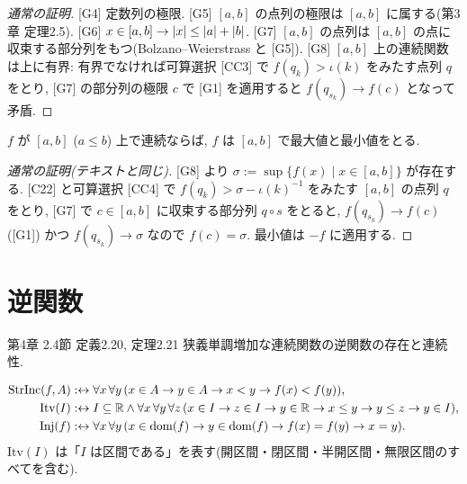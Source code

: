 \begin{lem}\end{lem}
\begin{proof}[通常の証明]
  [G4] 定数列の極限. [G5] $[a, b]$ の点列の極限は $[a, b]$ に属する(第3章 定理2.5). [G6] $x \in [a, b] \to \lvert x\rvert \leq \lvert a\rvert + \lvert b\rvert$. [G7] $[a, b]$ の点列は $[a, b]$ の点に収束する部分列をもつ(Bolzano--Weierstrass と [G5]). [G8] $[a, b]$ 上の連続関数は上に有界: 有界でなければ可算選択 [CC3] で $f(q_k) > \iota(k)$ をみたす点列 $q$ をとり, [G7] の部分列の極限 $c$ で [G1] を適用すると $f(q_{s_k}) \to f(c)$ となって矛盾.
\end{proof}

\begin{thm}
  $f$ が $[a, b]$ ($a \leq b$) 上で連続ならば, $f$ は $[a, b]$ で最大値と最小値をとる.
\end{thm}
\begin{proof}[通常の証明(テキストと同じ)]
  [G8] より $\sigma := \sup\{f(x) \mid x \in [a, b]\}$ が存在する. [C22] と可算選択 [CC4] で $f(q_k) > \sigma - \iota(k)^{-1}$ をみたす $[a, b]$ の点列 $q$ をとり, [G7] で $c \in [a, b]$ に収束する部分列 $q \circ s$ をとると, $f(q_{s_k}) \to f(c)$ ([G1]) かつ $f(q_{s_k}) \to \sigma$ なので $f(c) = \sigma$. 最小値は $-f$ に適用する.
\end{proof}

\section{逆関数}

\begin{textref}{第4章 2.4節 定義2.20, 定理2.21}
  狭義単調増加な連続関数の逆関数の存在と連続性.
\end{textref}

\begin{dfn}
  \begin{align*}
    \mathrm{StrInc}(f, A) &:\leftrightarrow \forall x\,\forall y\,(x \in A \to y \in A \to x < y \to f(x) < f(y)),\\
    \mathrm{Itv}(I) &:\leftrightarrow I \subseteq \mathbb{R} \land \forall x\,\forall y\,\forall z\,(x \in I \to z \in I \to y \in \mathbb{R} \to x \leq y \to y \leq z \to y \in I),\\
    \mathrm{Inj}(f) &:\leftrightarrow \forall x\,\forall y\,(x \in \mathrm{dom}(f) \to y \in \mathrm{dom}(f) \to f(x) = f(y) \to x = y).
  \end{align*}
  $\mathrm{Itv}(I)$ は「$I$ は区間である」を表す(開区間・閉区間・半開区間・無限区間のすべてを含む).
\end{dfn}


